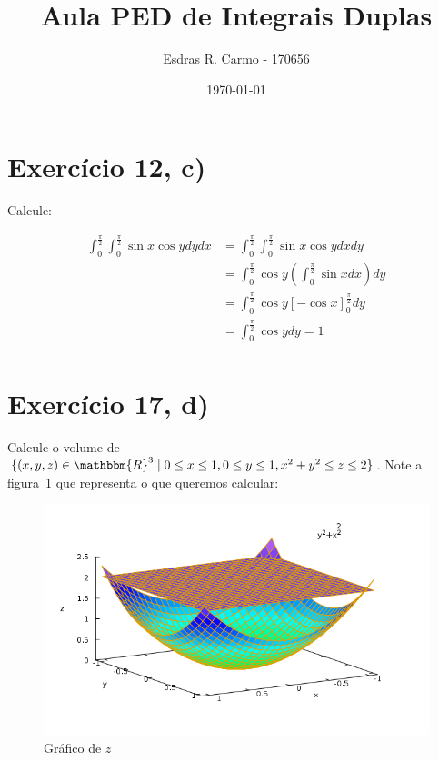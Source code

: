 \documentclass{article}
\author{Esdras R. Carmo - 170656}
\title{Aula PED de Integrais Duplas}
\date{\today}
\theoremstyle{definition}
\begin{document}
    \maketitle

    \section{Exercício 12, c)}
        Calcule:

        \begin{align*}
            \int_0^{\frac{\pi}{2}}\int_0^{\frac{\pi}{2}} \sin{x} \cos{y} dy dx &= \int_0^{\frac{\pi}{2}}\int_0^{\frac{\pi}{2}} \sin{x} \cos{y} dx dy\\
            &= \int_0^{\frac{\pi}{2}} \cos{y} \left( \int_0^{\frac{\pi}{2}} \sin{x} dx \right) dy\\
            &= \int_0^{\frac{\pi}{2}} \cos{y} \left[ -\cos{x} \right]_0^{\frac{\pi}{2}} dy\\
            &= \int_0^{\frac{\pi}{2}} \cos{y} dy = 1\\
        \end{align*}

    \section{Exercício 17, d)}
        Calcule o volume de $\{(x, y, z) \in \mathbbm{R}^3 \mid 0 \leq x \leq 1, 0 \leq y \leq 1, x^2 + y^2 \leq z \leq 2 \}$.
        Note a figura~\ref{fig:paraboloide-plano} que representa o que queremos calcular:

        \begin{figure}[h!]
            \includegraphics[width=\linewidth]{paraboloide-plano.png}
            \caption{Gráfico de $z$}
            \label{fig:paraboloide-plano}
        \end{figure}
\end{document}
